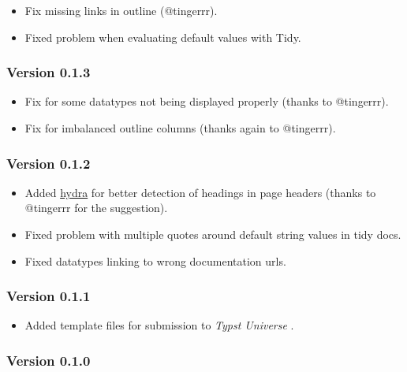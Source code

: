 \begin{itemize}
\tightlist
\item
  Fix missing links in outline (@tingerrr).
\item
  Fixed problem when evaluating default values with Tidy.
\end{itemize}

\subsubsection{Version 0.1.3}\label{version-0.1.3}

\begin{itemize}
\tightlist
\item
  Fix for some datatypes not being displayed properly (thanks to
  @tingerrr).
\item
  Fix for imbalanced outline columns (thanks again to @tingerrr).
\end{itemize}

\subsubsection{Version 0.1.2}\label{version-0.1.2}

\begin{itemize}
\tightlist
\item
  Added \href{https://typst.app/universe/package/hydra}{hydra} for
  better detection of headings in page headers (thanks to @tingerrr for
  the suggestion).
\item
  Fixed problem with multiple quotes around default string values in
  tidy docs.
\item
  Fixed datatypes linking to wrong documentation urls.
\end{itemize}

\subsubsection{Version 0.1.1}\label{version-0.1.1}

\begin{itemize}
\tightlist
\item
  Added template files for submission to \emph{Typst Universe} .
\end{itemize}

\subsubsection{Version 0.1.0}\label{version-0.1.0}

